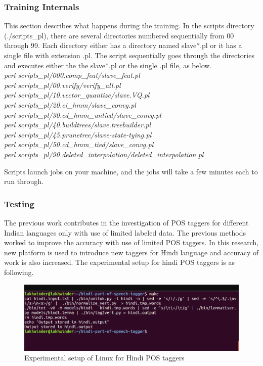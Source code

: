 \documentclass[12pt,a4paper,oneside]{memoir}
\begin{document}
\subsubsection{Training Internals}
This section describes what happens during the training. In the scripts directory (./scripts\_pl), there are several directories numbered sequentially from 00 through 99. Each directory either has a directory named slave*.pl or it has a single file with extension .pl. The script sequentially goes through the directories and executes either the the slave*.pl or the single .pl file, as below. \\
\textit{
perl scripts\_pl/000.comp\_feat/slave\_feat.pl\\
perl scripts\_pl/00.verify/verify\_all.pl\\
perl scripts\_pl/10.vector\_quantize/slave.VQ.pl\\
perl scripts\_pl/20.ci\_hmm/slave\_convg.pl\\
perl scripts\_pl/30.cd\_hmm\_untied/slave\_convg.pl\\
perl scripts\_pl/40.buildtrees/slave.treebuilder.pl\\
perl scripts\_pl/45.prunetree/slave-state-tying.pl\\
perl scripts\_pl/50.cd\_hmm\_tied/slave\_convg.pl\\
perl scripts\_pl/90.deleted\_interpolation/deleted\_interpolation.pl\\
}


 Scripts launch jobs on your machine, and the jobs will take a few minutes each to run through.

\subsubsection{Testing}
The previous work contributes in the investigation of POS taggers for different Indian languages only with use of limited labeled data. The previous methods worked to improve the accuracy with use of limited POS taggers. In this research, new platform is used to introduce new taggers for Hindi language and accuracy of work is also increased. The experimental setup for hindi POS taggers is as following.

\begin{figure}[h]
    \centering
    \includegraphics[scale=0.3]{jagjit3}
    \caption{Experimental setup of Linux for Hindi POS taggers}
\end{figure}
\end{document}
